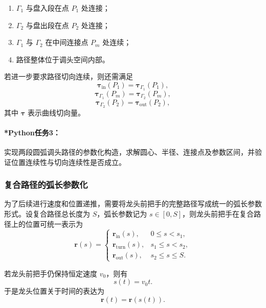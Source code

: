 \documentclass[12pt,a4paper]{ctexart}
\begin{document}
\begin{enumerate}
    \item $\Gamma_1$ 与盘入段在点 $P_1$ 处连接；
    \item $\Gamma_2$ 与盘出段在点 $P_2$ 处连接；
    \item $\Gamma_1$ 与 $\Gamma_2$ 在中间连接点 $P_m$ 处连续；
    \item 路径整体位于调头空间内部。
\end{enumerate}

若进一步要求路径切向连续，则还需满足
\begin{equation}
\bm{\tau}_{\mathrm{in}}(P_1)=\bm{\tau}_{\Gamma_1}(P_1),
\end{equation}
\begin{equation}
\bm{\tau}_{\Gamma_1}(P_m)=\bm{\tau}_{\Gamma_2}(P_m),
\end{equation}
\begin{equation}
\bm{\tau}_{\Gamma_2}(P_2)=\bm{\tau}_{\mathrm{out}}(P_2),
\end{equation}
其中 $\bm{\tau}$ 表示曲线切向量。

\paragraph{*Python任务3：}
实现两段圆弧调头路径的参数化构造，求解圆心、半径、连接点及参数区间，并验证位置连续性与切向连续性是否成立。

\subsubsection{复合路径的弧长参数化}
为了后续进行速度和位置递推，需要将龙头前把手的完整路径写成统一的弧长参数形式。设复合路径总长度为 $S$，弧长参数记为 $s\in[0,S]$，则龙头前把手在复合路径上的位置可统一表示为
\begin{equation}
\bm{r}(s)=
\begin{cases}
\bm{r}_{\mathrm{in}}(s), & 0\le s<s_1,\\
\bm{r}_{\mathrm{turn}}(s), & s_1\le s<s_2,\\
\bm{r}_{\mathrm{out}}(s), & s_2\le s\le S.
\end{cases}
\end{equation}

若龙头前把手仍保持恒定速度 $v_0$，则有
\begin{equation}
s(t)=v_0 t.
\end{equation}
于是龙头位置关于时间的表达为
\begin{equation}
\bm{r}(t)=\bm{r}(s(t)).
\end{equation}
\end{document}

